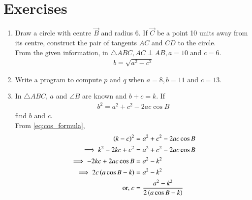 \documentclass[journal,12pt,twocolumn]{IEEEtran}
\renewcommand\thesection{\arabic{section}}
\begin{document}
\section{Exercises}
\begin{enumerate}[label=\thesection.\arabic*
,ref=\thesection.\theenumi]
\item Draw a circle with centre $\vec{B}$ and radius 6.  If $\vec{C}$ be  a point 10 units  away from its 
centre, construct the pair of tangents $AC$ and $CD$ to the 
circle.
\\
\solution From the given information, in $\triangle ABC, AC \perp AB, a = 
10$ and $c = 6$.
\begin{align}
b =  \sqrt{a^2-c^2}
\end{align}
\item Write a program to compute $p$ and $q$ when $a = 8, b = 11$ and $c = 13$. 
\item In $\triangle ABC$,  $a$ and  $\angle B$ are known and $b+c = k$. If 
\begin{align}
\label{eq:cos_formula}
b^2  = a^2+c^2- 2ac \cos B
\end{align}
%
find $b$ and $c$.
\\
\solution From \eqref{eq:cos_formula}, 
\begin{align}
\label{eq:aB}
\left(k-c\right)^2 &= a^2+c^2- 2ac \cos B
\\
\implies k^2 -2kc+c^2 &= a^2+c^2- 2ac \cos B
\\
\implies -2kc+ 2ac \cos B&= a^2-k^2 
\\
\implies 2c\left(a \cos B -k\right)&= a^2-k^2 
\\
\text{or, } c &= \frac{ a^2-k^2 }{2\left(a \cos B -k\right)}
\end{align}


\end{enumerate}
\end{document}
